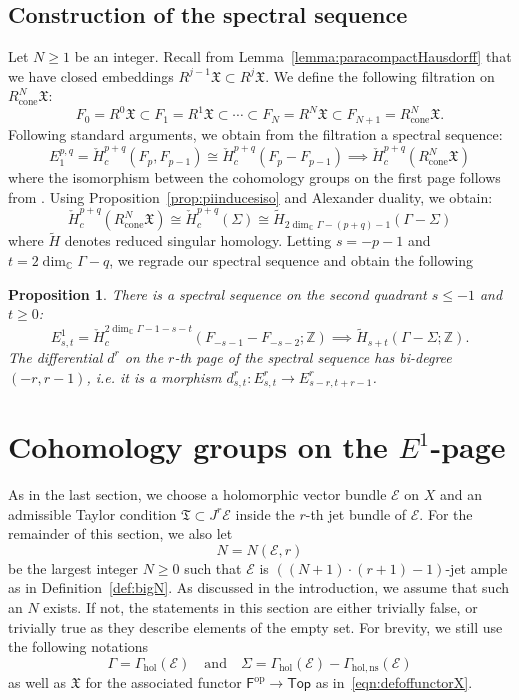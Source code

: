\documentclass[a4paper]{amsart}
\newcommand{\bZ}{\mathbb Z}
\newcommand{\bC}{\mathbb C}
\newcommand{\cE}{\mathcal E}
\newcommand{\fX}{\mathfrak X}
\newcommand{\fT}{\mathfrak T}
\newcommand{\op}{\text{op}}
\theoremstyle{plain}
\newtheorem{proposition}[theorem]{Proposition}
\theoremstyle{definition}
\newcommand{\catTop}{\mathsf{Top}}
\newcommand{\catF}{\mathsf{F}}
\newcommand{\CCH}{\check{H}_{c}}
\newcommand{\Gammahol}{\Gamma_{\mathrm{hol}}}
\begin{document}
\subsection{Construction of the spectral sequence}

Let $N \geq 1$ be an integer. Recall from Lemma~\ref{lemma:paracompactHausdorff} that we have closed embeddings $R^{j-1}\fX \subset R^j\fX$. We define the following filtration on $R^N_{\text{cone}}\fX$:
\[
    F_0 = R^0\fX \subset F_1 = R^1\fX \subset \cdots \subset F_N = R^N\fX \subset F_{N+1} = R^N_{\text{cone}}\fX.
\]
Following standard arguments, we obtain from the filtration a spectral sequence:
\[
    E_1^{p,q} = \CCH^{p+q}(F_p, F_{p-1}) \cong \CCH^{p+q}(F_p - F_{p-1}) \implies \CCH^{p+q}(R^N_{\text{cone}}\fX)
\]
where the isomorphism between the cohomology groups on the first page follows from \cite[II.12.3]{bredon_sheaf_1997}. Using Proposition~\ref{prop:piinducesiso} and Alexander duality, we obtain:
\[
    \CCH^{p+q}(R^N_{\text{cone}}\fX) \cong \CCH^{p+q}(\Sigma) \cong \widetilde{H}_{2\dim_\bC \Gamma - (p+q) -1}(\Gamma - \Sigma)
\]
where $\widetilde{H}$ denotes reduced singular homology. Letting $s = -p -1$ and $t = 2\dim_\bC \Gamma - q$, we regrade our spectral sequence and obtain the following
\begin{proposition}\label{prop:thereexistsSS}
There is a spectral sequence on the second quadrant $s \leq -1$ and $t \geq 0$:
\[
    E^1_{s,t} = \CCH^{2\dim_\bC \Gamma - 1 - s - t}(F_{-s-1} - F_{-s-2}; \bZ) \implies \widetilde{H}_{s+t}(\Gamma - \Sigma; \bZ).
\]
The differential $d^r$ on the $r$-th page of the spectral sequence has bi-degree $(-r,r-1)$, i.e. it is a morphism $d^r_{s,t} \colon E^r_{s,t} \to E^r_{s-r,t+r-1}$.
\end{proposition}

\section{Cohomology groups on the $E^1$-page}\label{section:cohomologygroups}

As in the last section, we choose a holomorphic vector bundle $\cE$ on $X$ and an admissible Taylor condition $\fT \subset J^r\cE$ inside the $r$-th jet bundle of $\cE$. For the remainder of this section, we also let 
\[
    N = N(\cE,r)
\]
be the largest integer $N \geq 0$ such that $\cE$ is $\left( (N+1) \cdot (r+1) - 1\right)$-jet ample as in Definition~\ref{def:bigN}. As discussed in the introduction, we assume that such an $N$ exists. If not, the statements in this section are either trivially false, or trivially true as they describe elements of the empty set. For brevity, we still use the following notations
\[
    \Gamma = \Gammahol\left(\cE\right) \quad \text{and} \quad \Sigma = \Gammahol\left(\cE\right) - \Gamma_{\mathrm{hol, ns}}\left(\cE\right)
\]
as well as $\fX$ for the associated functor $\catF^\op \to \catTop$ as in~\eqref{eqn:defoffunctorX}.
\end{document}
